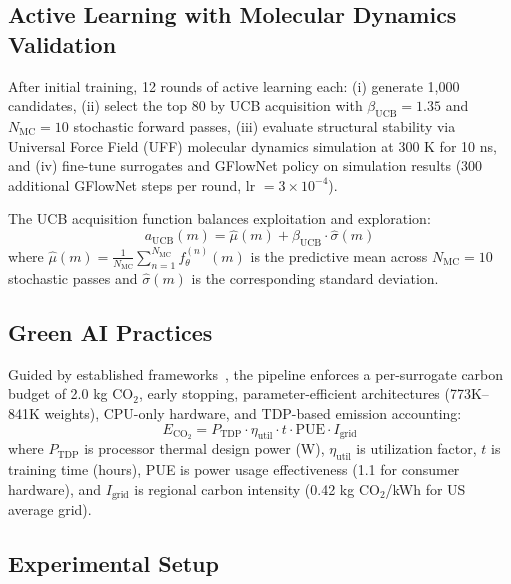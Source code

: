 \documentclass[twocolumn,10pt]{article}
\begin{document}
\subsection{Active Learning with Molecular Dynamics Validation}

After initial training, 12 rounds of active learning each: (i) generate 1,000 candidates, (ii) select the top 80 by UCB acquisition with $\beta_\text{UCB}=1.35$ and $N_\text{MC} = 10$ stochastic forward passes, (iii) evaluate structural stability via Universal Force Field (UFF) molecular dynamics simulation at 300 K for 10 ns, and (iv) fine-tune surrogates and GFlowNet policy on simulation results (300 additional GFlowNet steps per round, lr $= 3 \times 10^{-4}$).

The UCB acquisition function balances exploitation and exploration:
\begin{equation}
a_\text{UCB}(m) = \hat{\mu}(m) + \beta_\text{UCB} \cdot \hat{\sigma}(m)
\label{eq:ucb}
\end{equation}
where $\hat{\mu}(m) = \frac{1}{N_\text{MC}} \sum_{n=1}^{N_\text{MC}} f_\theta^{(n)}(m)$ is the predictive mean across $N_\text{MC} = 10$ stochastic passes and $\hat{\sigma}(m)$ is the corresponding standard deviation.

\subsection{Green AI Practices}

Guided by established frameworks~\cite{schwartz2020green,patterson2021carbon}, the pipeline enforces a per-surrogate carbon budget of 2.0 kg CO$_2$, early stopping, parameter-efficient architectures (773K–841K weights), CPU-only hardware, and TDP-based emission accounting:
\begin{equation}
E_{\text{CO}_2} = P_{\text{TDP}} \cdot \eta_{\text{util}} \cdot t \cdot \text{PUE} \cdot I_{\text{grid}}
\label{eq:carbon}
\end{equation}
where $P_\text{TDP}$ is processor thermal design power (W), $\eta_\text{util}$ is utilization factor, $t$ is training time (hours), PUE is power usage effectiveness (1.1 for consumer hardware), and $I_\text{grid}$ is regional carbon intensity (0.42 kg CO$_2$/kWh for US average grid).

\subsection{Experimental Setup}
\end{document}
